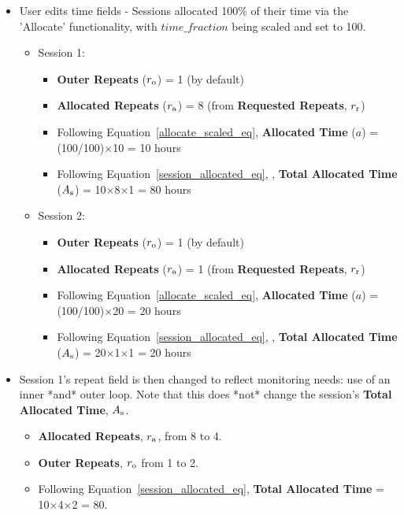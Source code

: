 \documentclass{article}
\begin{document}
\begin{itemize}
\begin{itemize}
    \end{itemize}
\item User edits time fields - Sessions allocated 100\% of their time via the 'Allocate' functionality, with $time\_fraction$ being scaled and set to 100.
    \begin{itemize}
    \item Session 1: 
        \begin{itemize}
        \item {\bf Outer Repeats} ($r_{\rm o}$) = 1 (by default)
        \item {\bf Allocated Repeats} ($r_{\rm a}$) = 8 (from {\bf Requested Repeats}, $r_{\rm r}$)
        \item Following Equation~\ref{allocate_scaled_eq}, {\bf Allocated Time} ($a$) = (100/100)$\times$10 = 10 hours
        \item Following Equation~\ref{session_allocated_eq}, , {\bf Total Allocated Time} ($A_{\rm s}$) = 10$\times$8$\times$1 = 80 hours
        \end{itemize}
    \item Session 2: 
        \begin{itemize}
        \item {\bf Outer Repeats} ($r_{\rm o}$) = 1 (by default)
        \item {\bf Allocated Repeats} ($r_{\rm a}$) = 1 (from {\bf Requested Repeats}, $r_{\rm r}$)
        \item Following Equation~\ref{allocate_scaled_eq}, {\bf Allocated Time} ($a$) = (100/100)$\times$20 = 20 hours
        \item Following Equation~\ref{session_allocated_eq}, , {\bf Total Allocated Time} ($A_{\rm s}$) = 20$\times$1$\times$1 = 20 hours
         \end{itemize}
     \end{itemize}
\item Session 1's repeat field is then changed to reflect monitoring needs: use of an inner *and* outer loop.  Note that this does *not* change the session's {\bf Total Allocated Time}, $A_{\rm s}$.
    \begin{itemize}
    \item {\bf Allocated Repeats}, $r_{\rm a}$, from 8 to 4.
    \item {\bf Outer Repeats}, $r_{\rm o}$ from 1 to 2.
    \item Following Equation~\ref{session_allocated_eq}, {\bf Total Allocated Time} = 10$\times$4$\times$2 = 80.
    \end{itemize}

\end{itemize}
\end{document}
